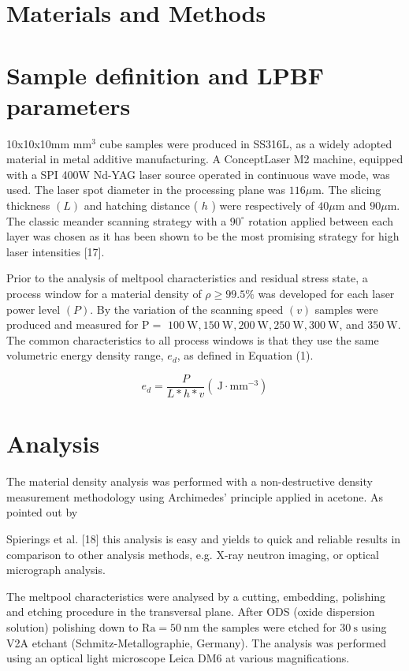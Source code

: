 \documentclass[10pt]{article}
\begin{document}
\section*{Materials and Methods}
\section*{Sample definition and LPBF parameters}
10x10x10mm $\mathrm{mm}^{3}$ cube samples were produced in SS316L, as a widely adopted material in metal additive manufacturing. A ConceptLaser M2 machine, equipped with a SPI 400W Nd-YAG laser source operated in continuous wave mode, was used. The laser spot diameter in the processing plane was $116 \mu \mathrm{m}$. The slicing thickness $(L)$ and hatching distance ( $h$ ) were respectively of $40 \mu \mathrm{m}$ and $90 \mu \mathrm{m}$. The classic meander scanning strategy with a $90^{\circ}$ rotation applied between each layer was chosen as it has been shown to be the most promising strategy for high laser intensities [17].

Prior to the analysis of meltpool characteristics and residual stress state, a process window for a material density of $\rho \geq 99.5 \%$ was developed for each laser power level $(P)$. By the variation of the scanning speed $(v)$ samples were produced and measured for $\mathrm{P}=$ $100 \mathrm{~W}, 150 \mathrm{~W}, 200 \mathrm{~W}, 250 \mathrm{~W}, 300 \mathrm{~W}$, and $350 \mathrm{~W}$. The common characteristics to all process windows is that they use the same volumetric energy density range, $e_{d}$, as defined in Equation (1).


\begin{equation*}
e_{d}=\frac{P}{L * h * v}\left(\mathrm{~J} \cdot \mathrm{mm}^{-3}\right) \tag{1}
\end{equation*}


\section*{Analysis}
The material density analysis was performed with a non-destructive density measurement methodology using Archimedes' principle applied in acetone. As pointed out by

Spierings et al. [18] this analysis is easy and yields to quick and reliable results in comparison to other analysis methods, e.g. X-ray neutron imaging, or optical micrograph analysis.

The meltpool characteristics were analysed by a cutting, embedding, polishing and etching procedure in the transversal plane. After ODS (oxide dispersion solution) polishing down to $\mathrm{Ra}=50 \mathrm{~nm}$ the samples were etched for $30 \mathrm{~s}$ using V2A etchant (Schmitz-Metallographie, Germany). The analysis was performed using an optical light microscope Leica DM6 at various magnifications.
\end{document}
